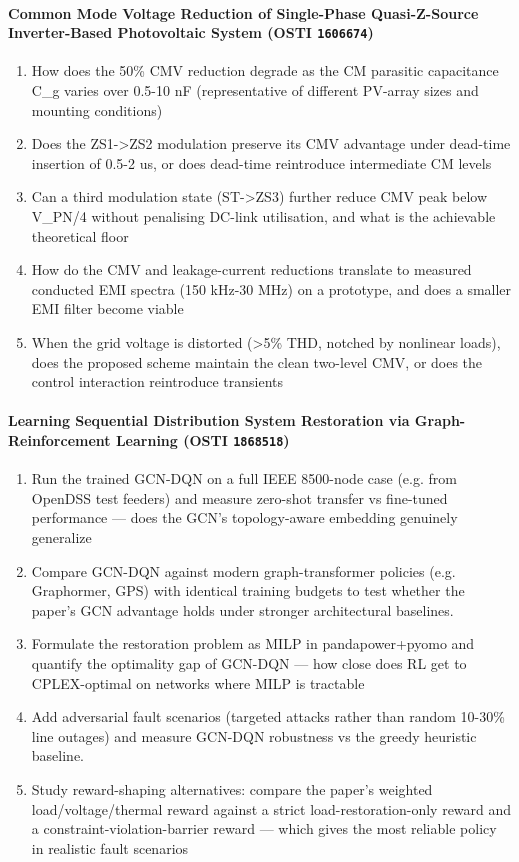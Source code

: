 \paragraph{Common Mode Voltage Reduction of Single-Phase Quasi-Z-Source Inverter-Based Photovoltaic System \textnormal{\small(OSTI \texttt{1606674})}}
\begin{enumerate}[leftmargin=1.6em,itemsep=0.2em,topsep=0.2em,label=Q\arabic*.]
\item How does the 50\% CMV reduction degrade as the CM parasitic capacitance C\_g varies over 0.5-10 nF (representative of different PV-array sizes and mounting conditions)
\item Does the ZS1-\textgreater{}ZS2 modulation preserve its CMV advantage under dead-time insertion of 0.5-2 us, or does dead-time reintroduce intermediate CM levels
\item Can a third modulation state (ST-\textgreater{}ZS3) further reduce CMV peak below V\_PN/4 without penalising DC-link utilisation, and what is the achievable theoretical floor
\item How do the CMV and leakage-current reductions translate to measured conducted EMI spectra (150 kHz-30 MHz) on a prototype, and does a smaller EMI filter become viable
\item When the grid voltage is distorted (\textgreater{}5\% THD, notched by nonlinear loads), does the proposed scheme maintain the clean two-level CMV, or does the control interaction reintroduce transients
\end{enumerate}
\paragraph{Learning Sequential Distribution System Restoration via Graph-Reinforcement Learning \textnormal{\small(OSTI \texttt{1868518})}}
\begin{enumerate}[leftmargin=1.6em,itemsep=0.2em,topsep=0.2em,label=Q\arabic*.]
\item Run the trained GCN-DQN on a full IEEE 8500-node case (e.g. from OpenDSS test feeders) and measure zero-shot transfer vs fine-tuned performance --- does the GCN's topology-aware embedding genuinely generalize
\item Compare GCN-DQN against modern graph-transformer policies (e.g. Graphormer, GPS) with identical training budgets to test whether the paper's GCN advantage holds under stronger architectural baselines.
\item Formulate the restoration problem as MILP in pandapower+pyomo and quantify the optimality gap of GCN-DQN --- how close does RL get to CPLEX-optimal on networks where MILP is tractable
\item Add adversarial fault scenarios (targeted attacks rather than random 10-30\% line outages) and measure GCN-DQN robustness vs the greedy heuristic baseline.
\item Study reward-shaping alternatives: compare the paper's weighted load/voltage/thermal reward against a strict load-restoration-only reward and a constraint-violation-barrier reward --- which gives the most reliable policy in realistic fault scenarios
\end{enumerate}
